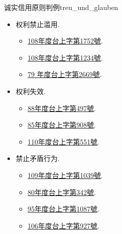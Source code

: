 \documentclass{article}
\begin{document}
\begin{example}{诚实信用原则判例}{treu_und_glauben}
    \begin{itemize}
        \item 权利禁止滥用.
        \begin{itemize}
            \item \href{https://judgment.judicial.gov.tw/FJUD/data.aspx?ty=JD&id=TPSV%2c108%2c%e5%8f%b0%e4%b8%8a%2c1752%2c20191217%2c1&ot=in}{108年度台上字第1752號}.
            \item \href{https://judgment.judicial.gov.tw/FJUD/data.aspx?ty=JD&id=TPSV,108%2c%e5%8f%b0%e4%b8%8a%2c1234%2c20200521%2c1}{108年度台上字第1234號}.
            \item \href{https://judgment.judicial.gov.tw/FJUD/data.aspx?ty=JD&id=TPSV,79%2c%e5%8f%b0%e4%b8%8a%2c2669%2c19901214%2c1}{79 年度台上字第2669號}.
        \end{itemize}
        \item 权利失效.
        \begin{itemize}
            \item \href{https://judgment.judicial.gov.tw/FJUD/data.aspx?ty=JD&id=TPSV,88%2c%e5%8f%b0%e4%b8%8a%2c497%2c19990311}{88年度台上字第497號}.
            \item \href{https://judgment.judicial.gov.tw/FJUD/data.aspx?ty=JD&id=TPSV,85%2c%e5%8f%b0%e4%b8%8a%2c908%2c19960426}{85年度台上字第908號}.
            \item \href{https://judgment.judicial.gov.tw/FJUD/data.aspx?ty=JD&id=TPSV,110%2c%e5%8f%b0%e4%b8%8a%2c551%2c20210311%2c1}{110年度台上字第551號}.
        \end{itemize}
        \item 禁止矛盾行为.
        \begin{itemize}
            \item \href{https://judgment.judicial.gov.tw/FJUD/data.aspx?ty=JD&id=TPSV,109%2c%e5%8f%b0%e4%b8%8a%2c1039%2c20200527%2c1}{109年度台上字第1039號}.
            \item \href{https://judgment.judicial.gov.tw/FJUD/data.aspx?ty=JD&id=TPSV,80%2c%e5%8f%b0%e4%b8%8a%2c342%2c19910222%2c1}{80年度台上字第342號}.
            \item \href{https://judgment.judicial.gov.tw/FJUD/data.aspx?ty=JD&id=TPSV,95%2c%e5%8f%b0%e4%b8%8a%2c1087%2c20060525}{95年度台上字第1087號}.
            \item \href{https://judgment.judicial.gov.tw/FJUD/data.aspx?ty=JD&id=TPSV,106%2c%e5%8f%b0%e4%b8%8a%2c927%2c20171122}{106年度台上字第927號}.

\end{itemize}
\end{itemize}
\end{example}
\end{document}
